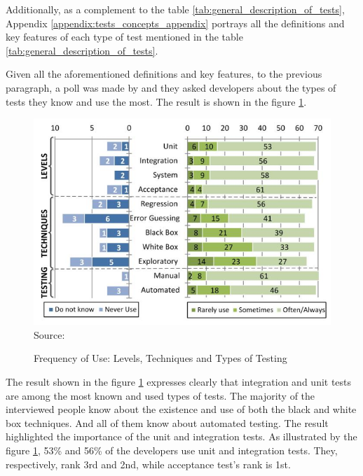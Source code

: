 Additionally, as a complement to the table \ref{tab:general_description_of_tests}, Appendix \ref{appendix:tests_concepts_appendix} portrays all the definitions and key features of each type of test mentioned in the table \ref{tab:general_description_of_tests}.

Given all the aforementioned definitions and key features, to the previous paragraph, a poll was made by \cite{sanchez2020beyond} and they asked developers about the types of tests they know and use the most. The result is shown in the figure \ref{fig:frequency_of_use_levels_techniques_and_types_of_testing}.

\begin{figure}[H]
    \centering
    \caption{Frequency of Use: Levels, Techniques and Types of Testing}
    \includegraphics[width=1\linewidth]{figures/tests/frequency_of_use__levels_techniques_and_types_of_testing.png}
    \label{fig:frequency_of_use_levels_techniques_and_types_of_testing}
    \footnotesize Source: \cite{sanchez2020beyond}
\end{figure}

The result shown in the figure \ref{fig:frequency_of_use_levels_techniques_and_types_of_testing}
expresses clearly that integration and unit tests are among the most known and used types of tests. The majority of the interviewed people know about the existence and use of both the black and white box techniques.
And all of them know about automated testing. The result highlighted the importance of the unit and integration tests. As illustrated by the figure \ref{fig:frequency_of_use_levels_techniques_and_types_of_testing},
53\% and 56\% of the developers use unit and integration tests. They, respectively, rank 3rd and 2nd, while acceptance test's rank is 1st.

